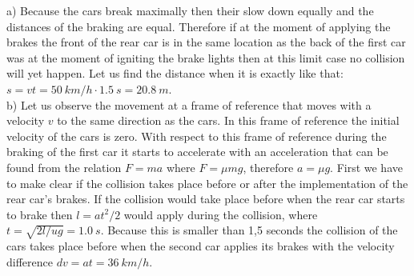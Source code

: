 \documentclass[11pt]{article}
\begin{document}

\solueng
a) Because the cars break maximally then their slow down equally and the distances of the braking are equal. Therefore if at the moment of applying the brakes the front of the rear car is in the same location as the back of the first car was at the moment of igniting the brake lights then at this limit case no collision will yet happen. Let us find the distance when it is exactly like that: $s=vt=\SI{50}{km/h}\cdot\SI{1,5}{s}=\SI{20,8}{m}$.\\
b) Let us observe the movement at a frame of reference that moves with a velocity $v$ to the same direction as the cars. In this frame of reference the initial velocity of the cars is zero. With respect to this frame of reference during the braking of the first car it starts to accelerate with an acceleration that can be found from the relation $F=ma$ where $F=\mu mg$, therefore $a=\mu g$. First we have to make clear if the collision takes place before or after the implementation of the rear car’s brakes. If the collision would take place before when the rear car starts to brake then $l=at^2/2$ would apply during the collision, where $t=\sqrt{2l/ug}=\SI{1.0}{s}$. Because this is smaller than 1,5 seconds the collision of the cars takes place before when the second car applies its brakes with the velocity difference $dv=at=\SI{36}{km/h}$.
\probend
\bigskip

\end{document}
